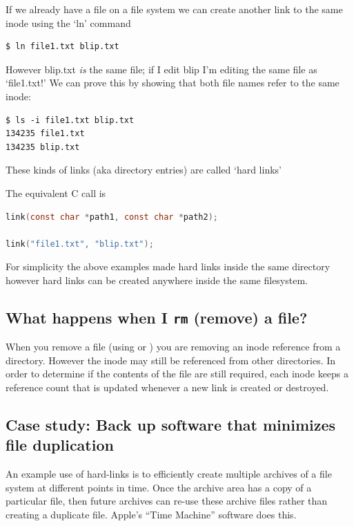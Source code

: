 If we already have a file on a file system we can create another link to the same inode using the `ln' command

\begin{lstlisting}
$ ln file1.txt blip.txt
\end{lstlisting}

However blip.txt \emph{is} the same file; if I edit blip I'm editing the same file as `file1.txt!' We can prove this by showing that both file names refer to the same inode:

\begin{lstlisting}
$ ls -i file1.txt blip.txt
134235 file1.txt
134235 blip.txt
\end{lstlisting}

These kinds of links (aka directory entries) are called `hard links'

The equivalent C call is 

\begin{lstlisting}[language=C]
link(const char *path1, const char *path2);

link("file1.txt", "blip.txt");
\end{lstlisting}

For simplicity the above examples made hard links inside the same directory however hard links can be created anywhere inside the same filesystem.

\subsection{\texorpdfstring{What happens when I \texttt{rm} (remove) a file?}{What happens when I rm (remove) a file?}}\label{what-happens-when-i-rm-remove-a-file}

When you remove a file (using  or ) you are removing an inode reference from a directory. However the inode may still be referenced from other directories. In order to determine if the contents of the file are still required, each inode keeps a reference count that is updated whenever a new link is created or destroyed.

\subsection{Case study: Back up software that minimizes file duplication}

An example use of hard-links is to efficiently create multiple archives of a file system at different points in time. Once the archive area has a copy of a particular file, then future archives can re-use these archive files rather than creating a duplicate file. Apple's ``Time Machine'' software does this.

